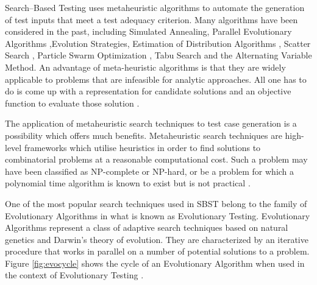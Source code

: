 Search–Based Testing uses metaheuristic algorithms to
automate the generation of test inputs that meet a test
adequacy criterion. Many algorithms have been considered in the past, including Simulated Annealing, Parallel Evolutionary Algorithms \cite{Alba2008},Evolution Strategies, Estimation of Distribution Algorithms , Scatter Search , Particle Swarm Optimization , Tabu Search and the Alternating Variable Method. An advantage of meta-heuristic algorithms is that they
are widely applicable to problems that are infeasible for analytic approaches. All one has to do is come up with a representation for candidate solutions and an objective function to evaluate those solution \cite{Baars2011}. 

The application of metaheuristic search techniques to test case generation is a possibility which offers much benefits. Metaheuristic search techniques are high-level frameworks which utilise heuristics in order to find solutions to combinatorial problems at a reasonable computational cost. Such a problem may have been classified as NP-complete or NP-hard, or be a problem for which a polynomial time algorithm is known to exist but is not practical \cite{McMinn2004}.

One of the most popular search techniques used in SBST belong to the family of Evolutionary Algorithms in what is known as Evolutionary Testing. Evolutionary Algorithms represent a class of adaptive search techniques based on natural genetics and Darwin’s theory of evolution. They are characterized by an iterative procedure that works in parallel on a number of potential solutions to a problem. Figure \ref{fig:evocycle}  shows the cycle
of an Evolutionary Algorithm when used in the context of
Evolutionary Testing \cite{Baars2011}.

